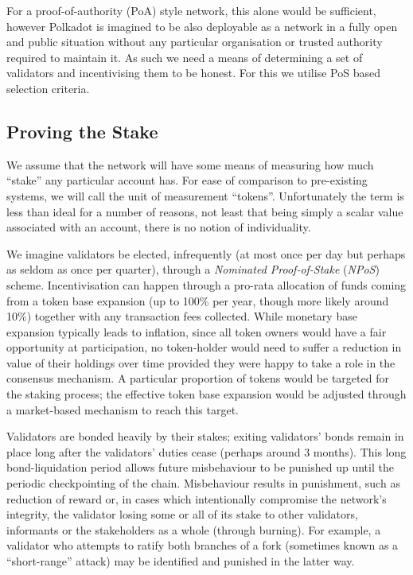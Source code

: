 \documentclass{beamer}
\begin{document}
\begin{frame}
 For a proof-of-authority (PoA) style network, this alone would be sufficient, however Polkadot is imagined to be also deployable as a network in a fully open and public situation without any particular organisation or trusted authority required to maintain it. As such we need a means of determining a set of validators and incentivising them to be honest. For this we utilise PoS based selection criteria.

\subsection{Proving the Stake}\label{proving-the-stake}

 We assume that the network will have some means of measuring how much ``stake'' any particular account has. For ease of comparison to pre-existing systems, we will call the unit of measurement ``tokens''. Unfortunately the term is less than ideal for a number of reasons, not least that being simply a scalar value associated with an account, there is no notion of individuality.

 We imagine validators be elected, infrequently (at most once per day but perhaps as seldom as once per quarter), through a \textit{Nominated Proof-of-Stake} (\textit{NPoS}) scheme. Incentivisation can happen through a pro-rata allocation of funds coming from a token base expansion (up to 100\% per year, though more likely around 10\%) together with any transaction fees collected. While monetary base expansion typically leads to inflation, since all token owners would have a fair opportunity at participation, no token-holder would need to suffer a reduction in value of their holdings over time provided they were happy to take a role in the consensus mechanism. A particular proportion of tokens would be targeted for the staking process; the effective token base expansion would be adjusted through a market-based mechanism to reach this target.

 Validators are bonded heavily by their stakes; exiting validators' bonds remain in place long after the validators' duties cease (perhaps around 3 months). This long bond-liquidation period allows future misbehaviour to be punished up until the periodic checkpointing of the chain. Misbehaviour results in punishment, such as reduction of reward or, in cases which intentionally compromise the network's integrity, the validator losing some or all of its stake to other validators, informants or the stakeholders as a whole (through burning). For example, a validator who attempts to ratify both branches of a fork (sometimes known as a ``short-range'' attack) may be identified and punished in the latter way.


\end{frame}
\end{document}
